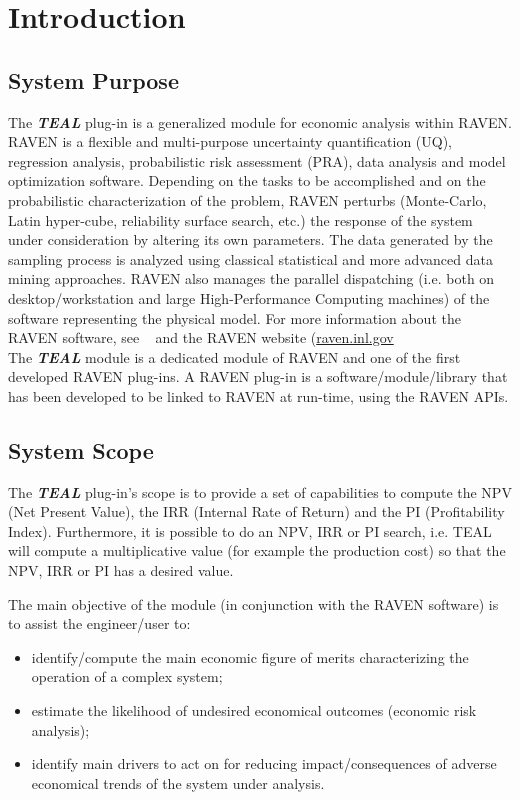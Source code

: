 \section{Introduction}
\subsection{System Purpose}

The \textbf{\textit{TEAL}} plug-in is a generalized module for economic analysis within RAVEN.
\\RAVEN is a flexible and multi-purpose uncertainty quantification (UQ), regression analysis, probabilistic risk assessment 
(PRA), data analysis and model optimization software.  Depending on the tasks to be accomplished and on the 
probabilistic
 characterization of the problem, RAVEN perturbs (Monte-Carlo, Latin hyper-cube, reliability surface search, etc.) the
 response of the system under consideration by altering its own parameters. 
 The data generated by the sampling process is analyzed using classical statistical
 and more advanced data mining approaches. RAVEN also manages the parallel dispatching (i.e. both on
 desktop/workstation and large High-Performance Computing machines) of the software representing the physical 
 model.
 For more information about the RAVEN software, see ~\cite{RAVENuserManual} and the RAVEN website (\url{raven.inl.gov}
\\The  \textbf{\textit{TEAL}} module is a dedicated module of RAVEN and one of the first developed RAVEN plug-ins.
A RAVEN plug-in is a software/module/library that has been developed to be linked to RAVEN at run-time, using the RAVEN APIs.


\subsection{System Scope}

The \textbf{\textit{TEAL}} plug-in’s scope is to provide a set of capabilities to compute the NPV (Net Present Value), the IRR
(Internal Rate of Return) and the PI (Profitability Index). Furthermore, it is possible to do an NPV, IRR or PI search, i.e. TEAL will
compute a multiplicative value (for example the production cost) so that the NPV, IRR or PI has a desired value.

 The main objective of the module (in conjunction with the RAVEN software) is to assist the engineer/user to:
\begin{itemize}
  \item identify/compute the main economic figure of merits characterizing the operation of a complex system;
  \item estimate the likelihood of undesired economical outcomes (economic risk analysis);
  \item identify main drivers to act on for reducing impact/consequences of adverse economical trends of the 
         system under analysis.
\end{itemize}

